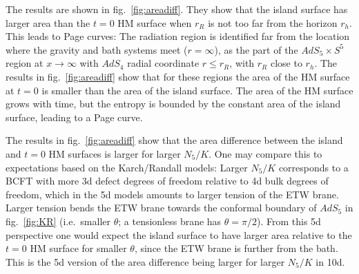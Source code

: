 \documentclass[aps,prd,11pt,notitlepage,longbibliography,nofootinbib,tightenlines,preprintnumbers]{revtex4-1}
\begin{document}
The results are shown in fig.~\ref{fig:areadiff}. They show that the island surface has larger area than the $t=0$ HM surface when $r_R$ is not too far from the horizon $r_h$. 
This leads to Page curves: The radiation region is identified far from the location where the gravity and bath systems meet ($r=\infty$), as the part of the $AdS_5\times S^5$ region at $x\rightarrow\infty$ with $AdS_4$ radial coordinate $r\leq r_R$, with $r_R$ close to $r_h$. 
The results in fig.~\ref{fig:areadiff} show that for these regions the area of the HM surface at $t=0$ is smaller than the area of the island surface. The area of the HM surface grows with time, but the entropy is bounded by the constant area of the island surface, leading to a Page curve.


The results in fig.~\ref{fig:areadiff} show that the area difference between the island and $t=0$ HM surfaces is larger for larger $N_5/K$.
One may compare this to expectations based on the Karch/Randall models: Larger $N_5/K$ corresponds to a BCFT with more 3d defect degrees of freedom relative to 4d bulk degrees of freedom, which in the 5d models amounts to larger tension of the ETW brane.
Larger tension bends the ETW brane towards the conformal boundary of $AdS_5$ in fig.~\ref{fig:KR} (i.e.\ smaller $\theta$; a tensionless brane has $\theta=\pi/2$).
From this 5d perspective one would expect the island surface to have larger area relative to the $t=0$ HM surface for smaller $\theta$, since the ETW brane is further from the bath. This is the 5d version of the area difference being larger for larger $N_5/K$ in 10d.
\end{document}
